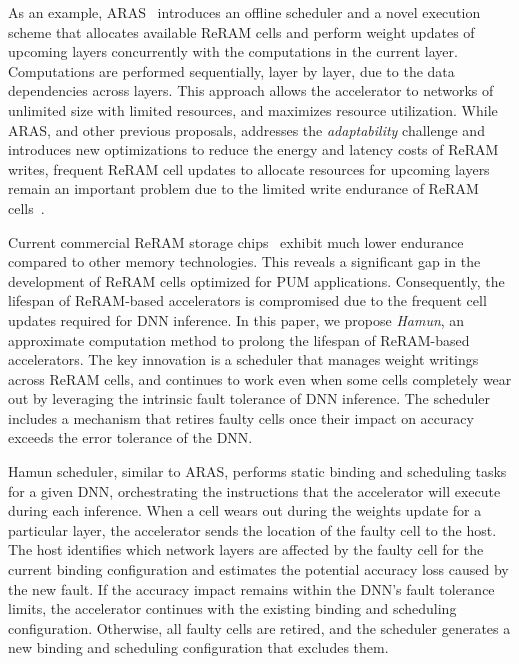 
As an example, ARAS~\cite{ARAS} introduces an offline scheduler and a novel execution scheme that allocates available ReRAM cells and perform weight updates of upcoming layers concurrently with the computations in the current layer. Computations are performed sequentially, layer by layer, due to the data dependencies across layers. This approach allows the accelerator to networks of unlimited size with limited resources, and maximizes resource utilization. While ARAS, and other previous proposals, addresses the \textit{adaptability} challenge and introduces new optimizations to reduce the energy and latency costs of ReRAM writes, frequent ReRAM cell updates to allocate resources for upcoming layers remain an important problem due to the limited write endurance of ReRAM cells~\cite{ReRAM_Challenges, ReRAM_characterizing, Aging}.

Current commercial ReRAM storage chips~\cite{Weebit, crossbar} exhibit much lower endurance compared to other memory technologies. This reveals a significant gap in the development of ReRAM cells optimized for PUM applications. Consequently, the lifespan of ReRAM-based accelerators is compromised due to the frequent cell updates required for DNN inference. In this paper, we propose \textit{Hamun\footnotemark}, an approximate computation method to prolong the lifespan of ReRAM-based accelerators. The key innovation is a scheduler that manages weight writings across ReRAM cells, and continues to work even when some cells completely wear out by leveraging the intrinsic fault tolerance of DNN inference. The scheduler includes a mechanism that retires faulty cells once their impact on accuracy exceeds the error tolerance of the DNN.


Hamun scheduler, similar to ARAS, performs static binding and scheduling tasks for a given DNN, orchestrating the instructions that the accelerator will execute during each inference. When a cell wears out during the weights update for a particular layer, the accelerator sends the location of the faulty cell to the host. The host identifies which network layers are affected by the faulty cell for the current binding configuration and estimates the potential accuracy loss caused by the new fault. If the accuracy impact remains within the DNN’s fault tolerance limits, the accelerator continues with the existing binding and scheduling configuration. Otherwise, all faulty cells are retired, and the scheduler generates a new binding and scheduling configuration that excludes them.

